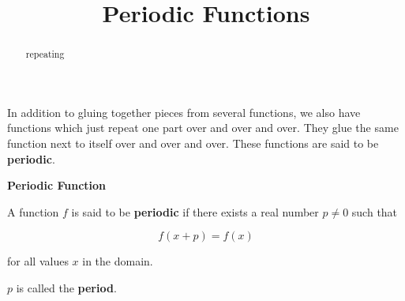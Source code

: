 \documentclass{ximera}
\title{Periodic Functions}
\begin{document}
\begin{abstract}
repeating
\end{abstract}
\maketitle



In addition to gluing together pieces from several functions, we also have functions which just repeat one part over and over and over. They glue the same function next to itself over and over and over.  These functions are said to be \textbf{periodic}.



\begin{definition} \textbf{\textcolor{green!50!black}{Periodic Function}}


A function $f$ is said to be \textbf{periodic} if there exists a real number $p \ne 0$ such that

\[
f(x+p) = f(x)
\]

for all values $x$ in the domain.


$p$ is called the \textbf{period}.


\end{definition}
\end{document}
